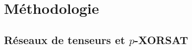 \begin{comment}
\end{comment}

\part{Méthodologie}\label{part:methodology}

\chapter{Réseaux de tenseurs et \texorpdfstring{$p$}{p}-XORSAT}\label{ch:tns-and-p-xorsat}

